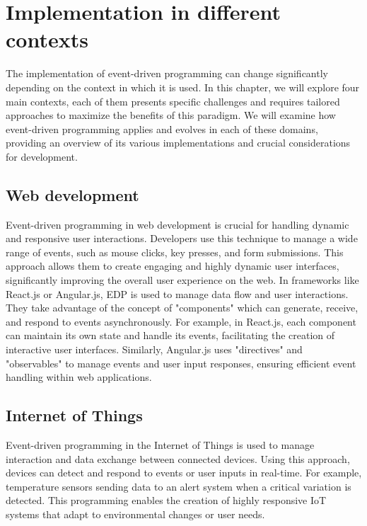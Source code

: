 \documentclass[twocolumn]{article}
\begin{document}
\section{Implementation in different contexts}
\label{sec:diffContexts}

The implementation of event-driven programming can change significantly depending on the context in which it is used.
In this chapter, we will explore four main contexts, each of them presents specific challenges and requires tailored approaches to maximize the benefits of this paradigm.
We will examine how event-driven programming applies and evolves in each of these domains, providing an overview of its various implementations and crucial considerations for development.

\subsection{Web development}

Event-driven programming in web development is crucial for handling dynamic and responsive user interactions. 
Developers use this technique to manage a wide range of events, such as mouse clicks, key presses, and form submissions. 
This approach allows them to create engaging and highly dynamic user interfaces, significantly improving the overall user experience on the web.  
In frameworks like React.js or Angular.js, EDP is used to manage data flow and user interactions. 
They take advantage of the concept of "components" which can generate, receive, and respond to events asynchronously. 
For example, in React.js, each component can maintain its own state and handle its events, facilitating the creation of interactive user interfaces. 
Similarly, Angular.js uses "directives" and "observables" to manage events and user input responses, ensuring efficient event handling within web applications.

\subsection{Internet of Things}

Event-driven programming in the Internet of Things is used to manage interaction and data exchange between connected devices. 
Using this approach, devices can detect and respond to events or user inputs in real-time. 
For example, temperature sensors sending data to an alert system when a critical variation is detected. 
This programming enables the creation of highly responsive IoT systems that adapt to environmental changes or user needs.
\end{document}
